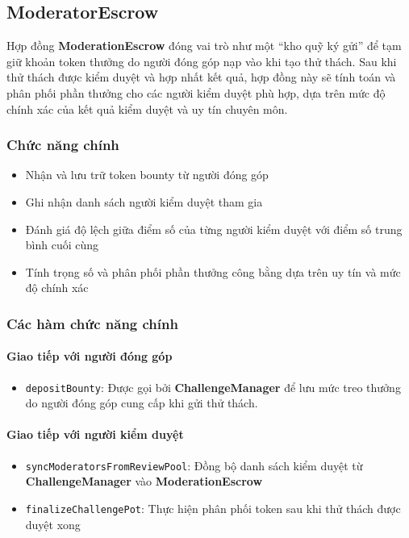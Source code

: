 \subsection{ModeratorEscrow}

Hợp đồng \textbf{ModerationEscrow} đóng vai trò như một ``kho quỹ ký gửi'' để tạm giữ khoản token thưởng do người đóng góp nạp vào khi tạo thử thách.
Sau khi thử thách được kiểm duyệt và hợp nhất kết quả, hợp đồng này sẽ tính toán và phân phối phần thưởng cho các người kiểm duyệt phù hợp, dựa trên mức độ chính xác của kết quả kiểm duyệt và uy tín chuyên môn.

\subsubsection{Chức năng chính}

\begin{itemize}
  \item Nhận và lưu trữ token bounty từ người đóng góp
  \item Ghi nhận danh sách người kiểm duyệt tham gia
  \item Đánh giá độ lệch giữa điểm số của từng người kiểm duyệt với điểm số trung bình cuối cùng
  \item Tính trọng số và phân phối phần thưởng công bằng dựa trên uy tín và mức độ chính xác
\end{itemize}

\subsubsection{Các hàm chức năng chính}

\paragraph{Giao tiếp với người đóng góp}

\begin{itemize}
  \item \texttt{depositBounty}: Được gọi bởi \textbf{ChallengeManager} để lưu mức treo thưởng do người đóng góp cung cấp khi gửi thử thách.
\end{itemize}

\paragraph{Giao tiếp với người kiểm duyệt}

\begin{itemize}
  \item \texttt{syncModeratorsFromReviewPool}: Đồng bộ danh sách kiểm duyệt từ \textbf{ChallengeManager} vào \textbf{ModerationEscrow}
  \item \texttt{finalizeChallengePot}: Thực hiện phân phối token sau khi thử thách được duyệt xong
\end{itemize}

